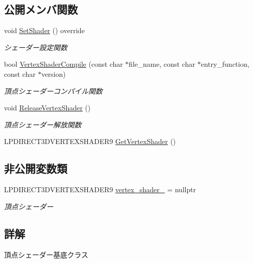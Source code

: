 \subsection*{公開メンバ関数}
\begin{DoxyCompactItemize}
\item 
void \mbox{\hyperlink{class_vertex_shader_base_a9f93697c5668852850f0a7b7ef7cb67f}{Set\+Shader}} () override
\begin{DoxyCompactList}\small\item\em シェーダー設定関数 \end{DoxyCompactList}\item 
bool \mbox{\hyperlink{class_vertex_shader_base_a6565abadb8ac173d3273ab1698d31c6c}{Vertex\+Shader\+Compile}} (const char $\ast$file\+\_\+name, const char $\ast$entry\+\_\+function, const char $\ast$version)
\begin{DoxyCompactList}\small\item\em 頂点シェーダーコンパイル関数 \end{DoxyCompactList}\item 
void \mbox{\hyperlink{class_vertex_shader_base_a42ff1e32a2c231f77d0ba0e6a8312e63}{Release\+Vertex\+Shader}} ()
\begin{DoxyCompactList}\small\item\em 頂点シェーダー解放関数 \end{DoxyCompactList}\item 
L\+P\+D\+I\+R\+E\+C\+T3\+D\+V\+E\+R\+T\+E\+X\+S\+H\+A\+D\+E\+R9 \mbox{\hyperlink{class_vertex_shader_base_ab10cf1aac4a54653c553b5c84e1d3703}{Get\+Vertex\+Shader}} ()
\end{DoxyCompactItemize}
\subsection*{非公開変数類}
\begin{DoxyCompactItemize}
\item 
L\+P\+D\+I\+R\+E\+C\+T3\+D\+V\+E\+R\+T\+E\+X\+S\+H\+A\+D\+E\+R9 \mbox{\hyperlink{class_vertex_shader_base_a06f34810bedce79d6115c88a61dfbea4}{vertex\+\_\+shader\+\_\+}} = nullptr
\begin{DoxyCompactList}\small\item\em 頂点シェーダー \end{DoxyCompactList}\end{DoxyCompactItemize}


\subsection{詳解}
頂点シェーダー基底クラス 

